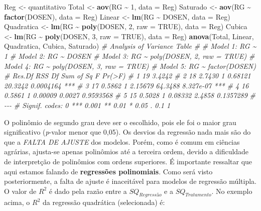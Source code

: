\documentclass[
]{book}
\newenvironment{Shaded}{\begin{snugshade}}{\end{snugshade}}
\newcommand{\CommentTok}[1]{\textcolor[rgb]{0.56,0.35,0.01}{\textit{#1}}}
\newcommand{\DataTypeTok}[1]{\textcolor[rgb]{0.13,0.29,0.53}{#1}}
\newcommand{\DecValTok}[1]{\textcolor[rgb]{0.00,0.00,0.81}{#1}}
\newcommand{\KeywordTok}[1]{\textcolor[rgb]{0.13,0.29,0.53}{\textbf{#1}}}
\newcommand{\NormalTok}[1]{#1}
\newcommand{\OperatorTok}[1]{\textcolor[rgb]{0.81,0.36,0.00}{\textbf{#1}}}
\newcommand{\OtherTok}[1]{\textcolor[rgb]{0.56,0.35,0.01}{#1}}
\newcommand{\StringTok}[1]{\textcolor[rgb]{0.31,0.60,0.02}{#1}}
\numberwithin{equation}{section}
\newcommand{\indt}[1]{\index{#1|ST}}
\begin{document}
\begin{Shaded}
\begin{Highlighting}[]
\NormalTok{Reg \textless{}{-}}\StringTok{ }\NormalTok{quantitativo}
\NormalTok{Total \textless{}{-}}\StringTok{ }\KeywordTok{aov}\NormalTok{(RG }\OperatorTok{\textasciitilde{}}\StringTok{ }\DecValTok{1}\NormalTok{, }\DataTypeTok{data =}\NormalTok{ Reg)}
\NormalTok{Saturado \textless{}{-}}\StringTok{ }\KeywordTok{aov}\NormalTok{(RG }\OperatorTok{\textasciitilde{}}\StringTok{ }\KeywordTok{factor}\NormalTok{(DOSEN), }\DataTypeTok{data =}\NormalTok{ Reg)}
\NormalTok{Linear \textless{}{-}}\StringTok{ }\KeywordTok{lm}\NormalTok{(RG }\OperatorTok{\textasciitilde{}}\StringTok{ }\NormalTok{DOSEN, }\DataTypeTok{data =}\NormalTok{ Reg)}
\NormalTok{Quadratica \textless{}{-}}\StringTok{ }\KeywordTok{lm}\NormalTok{(RG }\OperatorTok{\textasciitilde{}}\StringTok{ }\KeywordTok{poly}\NormalTok{(DOSEN, }\DecValTok{2}\NormalTok{, }\DataTypeTok{raw =} \OtherTok{TRUE}\NormalTok{), }\DataTypeTok{data =}\NormalTok{ Reg)}
\NormalTok{Cubica \textless{}{-}}\StringTok{ }\KeywordTok{lm}\NormalTok{(RG }\OperatorTok{\textasciitilde{}}\StringTok{ }\KeywordTok{poly}\NormalTok{(DOSEN, }\DecValTok{3}\NormalTok{, }\DataTypeTok{raw =} \OtherTok{TRUE}\NormalTok{), }\DataTypeTok{data =}\NormalTok{ Reg)}
\KeywordTok{anova}\NormalTok{(Total, Linear, Quadratica, Cubica, Saturado) }
\CommentTok{\# Analysis of Variance Table}
\CommentTok{\# }
\CommentTok{\# Model 1: RG \textasciitilde{} 1}
\CommentTok{\# Model 2: RG \textasciitilde{} DOSEN}
\CommentTok{\# Model 3: RG \textasciitilde{} poly(DOSEN, 2, raw = TRUE)}
\CommentTok{\# Model 4: RG \textasciitilde{} poly(DOSEN, 3, raw = TRUE)}
\CommentTok{\# Model 5: RG \textasciitilde{} factor(DOSEN)}
\CommentTok{\#   Res.Df    RSS Df Sum of Sq       F    Pr(\textgreater{}F)    }
\CommentTok{\# 1     19 3.4242                                   }
\CommentTok{\# 2     18 2.7430  1   0.68121 20.3242 0.0004164 ***}
\CommentTok{\# 3     17 0.5862  1   2.15679 64.3488 8.327e{-}07 ***}
\CommentTok{\# 4     16 0.5861  1   0.00009  0.0027 0.9593568    }
\CommentTok{\# 5     15 0.5028  1   0.08332  2.4858 0.1357289    }
\CommentTok{\# {-}{-}{-}}
\CommentTok{\# Signif. codes:  0 \textquotesingle{}***\textquotesingle{} 0.001 \textquotesingle{}**\textquotesingle{} 0.01 \textquotesingle{}*\textquotesingle{} 0.05 \textquotesingle{}.\textquotesingle{} 0.1 \textquotesingle{} \textquotesingle{} 1}
\end{Highlighting}
\end{Shaded}

O polinômio \indt{polinômio} de segundo grau deve ser o escolhido, pois ele foi o maior grau significativo (\emph{p}-valor menor que 0,05). Os desvios da regressão nada mais são do que a \emph{FALTA DE AJUSTE} \indt{falta de ajuste} dos modelos. Porém, como é comum em ciências agrárias, ajusta-se apenas polinômios até a terceira ordem, devido a dificuldade de interpretção de polinômios com ordens superiores. É importante ressaltar que aqui estamos falando de \textbf{regressões polinomiais}. Como será visto posteriormente, a falta de ajuste é inaceitável para modelos de regressão múltipla. O valor de \(R^2\) é dado pela razão entre a \(SQ_{Regressão}\) e a \(SQ_{Tratamento}\). No exemplo acima, o \(R^2\) da regressão quadrática (selecionada) é:
\end{document}
